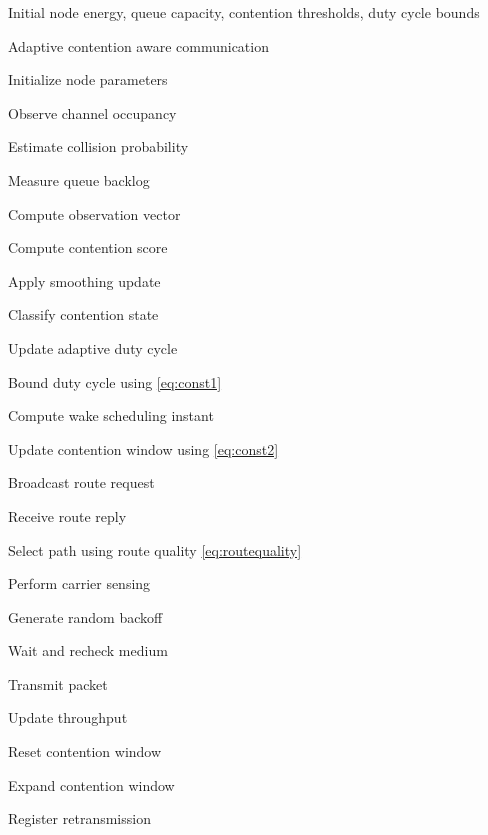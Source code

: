 \documentclass[a4paper,fleqn,final,1p]{cas-dc}
\numberwithin{equation}{section}
\begin{document}
\begin{algorithm}[H]
\caption{Integrated Adaptive MAC Routing Algorithm}
\label{alg:mainfinal}
\begin{algorithmic}[1]

\Require
Initial node energy,
queue capacity,
contention thresholds,
duty cycle bounds

\Ensure
Adaptive contention aware communication

\State Initialize node parameters


\State Observe channel occupancy

\State Estimate collision probability

\State Measure queue backlog

\State Compute observation vector

\State Compute contention score

\State Apply smoothing update

\State Classify contention state

\State Update adaptive duty cycle

\State Bound duty cycle using
\ref{eq:const1}

\State Compute wake scheduling instant

\State Update contention window using
\ref{eq:const2}


\State Broadcast route request

\State Receive route reply

\State Select path using route quality
\ref{eq:routequality}

\EndIf

\State Perform carrier sensing


\State Generate random backoff

\State Wait and recheck medium


\State Transmit packet


\State Update throughput

\State Reset contention window

\Else

\State Expand contention window

\State Register retransmission

\EndIf


\end{algorithmic}
\end{algorithm}
\end{document}
